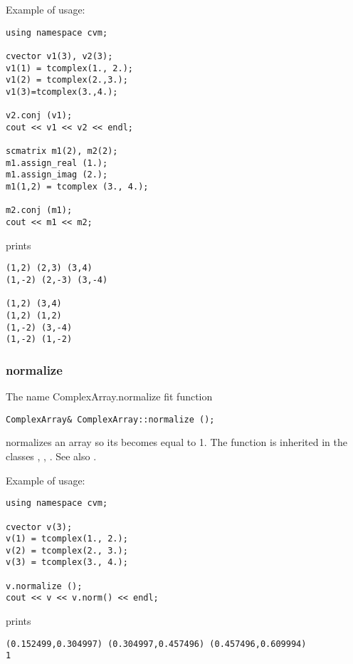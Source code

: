 Example of usage:
\begin{verbatim}
using namespace cvm;

cvector v1(3), v2(3);
v1(1) = tcomplex(1., 2.);
v1(2) = tcomplex(2.,3.);
v1(3)=tcomplex(3.,4.);

v2.conj (v1);
cout << v1 << v2 << endl;

scmatrix m1(2), m2(2);
m1.assign_real (1.);
m1.assign_imag (2.);
m1(1,2) = tcomplex (3., 4.);

m2.conj (m1);
cout << m1 << m2;
\end{verbatim}
prints
\begin{verbatim}
(1,2) (2,3) (3,4)
(1,-2) (2,-3) (3,-4)

(1,2) (3,4)
(1,2) (1,2)
(1,-2) (3,-4)
(1,-2) (1,-2)
\end{verbatim}
\newpage



\subsubsection{normalize}
The%
\pdfdest name {ComplexArray.normalize} fit{ }
function
\begin{verbatim}
ComplexArray& ComplexArray::normalize ();
\end{verbatim}
normalizes an array so its 
becomes equal to 1. The function is inherited in the classes
,
,
.
See also .

Example of usage:
\begin{verbatim}
using namespace cvm;

cvector v(3);
v(1) = tcomplex(1., 2.);
v(2) = tcomplex(2., 3.);
v(3) = tcomplex(3., 4.);

v.normalize ();
cout << v << v.norm() << endl;
\end{verbatim}
prints
\begin{verbatim}
(0.152499,0.304997) (0.304997,0.457496) (0.457496,0.609994)
1
\end{verbatim}
\newpage

